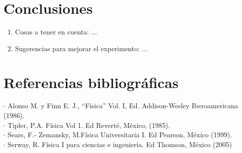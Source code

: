 \begin{multicols}{2}
\section*{Conclusiones} 
\begin{enumerate}
    \item Cosas a tener en cuenta: ...
    \item Sugerencias para mejorar el experimento: ...
\end{enumerate}
\section*{Referencias bibliográficas}
\small{
$\cdot$ Alonso M. y Finn E. J., “Física” Vol. I, Ed. Addison-Wesley Iberoamericana (1986). \\ 
$\cdot$ Tipler, P.A. Física Vol 1. Ed Reverté, México, (1985).\\
$\cdot$ Sears, F.- Zemansky, M.Física Universitaria I. Ed Pearson, México (1999).\\
$\cdot$ Serway, R. Física I para ciencias e ingeniería. Ed Thomson, México (2005)
}
\end{multicols}